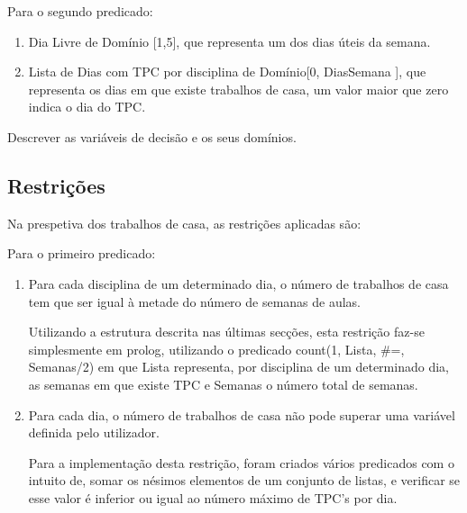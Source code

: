 \documentclass{llncs}
\begin{document}
Para o segundo predicado:
\begin{enumerate}
\item Dia Livre de Domínio [1,5], que representa um dos dias úteis da semana.
\item Lista de Dias com TPC por disciplina de Domínio[0, DiasSemana ], que representa os dias em que existe trabalhos de casa, um valor maior que zero indica o dia do TPC.
\end{enumerate}



Descrever as variáveis de decisão e os seus domínios.

\subsection{Restrições}
Na prespetiva dos trabalhos de casa, as restrições aplicadas são:

Para o primeiro predicado:
\begin{enumerate}
\item Para cada disciplina de um determinado dia, o número de trabalhos de casa tem que ser igual à metade do número de semanas de aulas.

Utilizando a estrutura descrita nas últimas secções, esta restrição faz-se simplesmente em prolog, utilizando o predicado count(1, Lista, \#=, Semanas/2) em que Lista representa, por disciplina de um determinado dia, as semanas em que existe TPC e Semanas o número total de semanas.

\item Para cada dia, o número de trabalhos de casa não pode superar uma variável definida pelo utilizador.

Para a implementação desta restrição, foram criados vários predicados com o intuito de, somar os nésimos elementos de um conjunto de listas, e verificar se esse valor é inferior ou igual ao número máximo de TPC's por dia. 
\end{enumerate}
\end{document}
